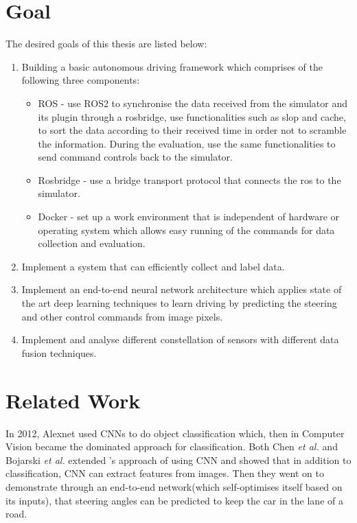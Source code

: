 \section{Goal}
    The desired goals of this thesis are listed below:

    \begin{enumerate}
    \item Building a basic autonomous driving framework which comprises of the following three
        components:
        \begin{itemize}
        \item ROS - use ROS2 to synchronise the data received from the simulator and its plugin through a
            rosbridge, use functionalities such as slop and cache, to sort the data according to
            their received time in order not to scramble the information. During the evaluation,
            use the same functionalities to send command controls back to the simulator.
        \item Rosbridge - use a bridge transport protocol that connects the ros to the simulator.
        \item Docker - set up a work environment that is independent of hardware or
            operating system which allows easy running of the commands for data collection
            and evaluation.
        \end{itemize}
    \item Implement a system that can efficiently collect and label data.
    \item Implement an end-to-end neural network architecture which applies state of the
        art deep learning techniques to learn driving by predicting the steering and other
        control commands from image pixels.
    \item Implement and analyse different constellation of sensors with different data
        fusion techniques.
    \end{enumerate}

\section{Related Work}
In 2012, Alexnet \cite{Alexnet2012} used CNNs to do object classification which, then
in Computer Vision became the dominated approach for classification. Both Chen \textit{et
al.} \cite{chen2017} and Bojarski \textit{et al.} \cite{bojarski2016end} extended
\cite{Alexnet2012}'s approach of using CNN and showed that in addition to classification, CNN can
extract features from images. Then they went on to demonstrate through an end-to-end
network(which self-optimises itself based on its inputs), that steering angles can be
predicted to keep the car in the lane of a road.

